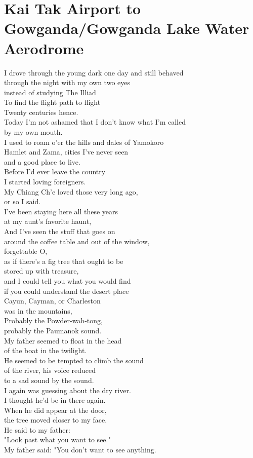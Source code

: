 \documentclass[smalldemyvopaper,11pt,twoside,onecolumn,openright,extrafontsizes]{memoir}
\begin{document}
\chapter{Kai Tak Airport to Gowganda/Gowganda Lake Water Aerodrome}
I drove through the young dark one day and still behaved
\\through the night with my own two eyes
\\instead of studying The Illiad
\\To find the flight path to flight
\\Twenty centuries hence.
\\Today I'm not ashamed that I don't know what I'm called
\\by my own mouth.
\\I used to roam o'er the hills and dales of Yamokoro
\\Hamlet and Zama, cities I've never seen
\\and a good place to live.
\\Before I'd ever leave the country
\\I started loving foreigners.
\\My Chiang Ch'e loved those very long ago,
\\or so I said.
\\I've been staying here all these years
\\at my aunt's favorite haunt,
\\And I've seen the stuff that goes on
\\around the coffee table and out of the window,
\\forgettable O,
\\as if there's a fig tree that ought to be
\\stored up with treasure,
\\and I could tell you what you would find
\\if you could understand the desert place
\\Cayun, Cayman, or Charleston
\\was in the mountains,
\\Probably the Powder-wah-tong,
\\probably the Paumanok sound.
\\My father seemed to float in the head
\\of the boat in the twilight.
\\He seemed to be tempted to climb the sound
\\of the river, his voice reduced
\\to a sad sound by the sound.
\\I again was guessing about the dry river.
\\I thought he'd be in there again.
\\When he did appear at the door,
\\the tree moved closer to my face.
\\He said to my father:
\\"Look past what you want to see."
\\My father said: "You don't want to see anything.
\end{document}
